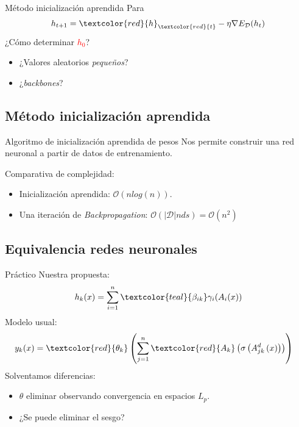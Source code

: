 \documentclass{beamer}
\begin{document}
\begin{frame}{Método inicialización aprendida}
    Para 
    \begin{align*}
        h_{t+1}  = \textcolor{red}{h}_{\textcolor{red}{t}} - \eta \nabla E_{\mathcal{D}}(h_t)
    \end{align*}
    ¿Cómo determinar  \textcolor{red}{$h_0$}?
    \pause
    \begin{itemize}
        \item ¿Valores aleatorios \textit{pequeños}?
        \item ¿\textit{backbones}?
    \end{itemize}
\end{frame}

\subsection{Método inicialización aprendida}
\begin{frame}{Algoritmo de inicialización aprendida de pesos}
    Nos permite construir una red neuronal a partir de datos de entrenamiento.

    Comparativa de complejidad:
    \begin{itemize}
        \item Inicialización aprendida: $\mathcal{O}(n log(n))$. 
        \item Una iteración de \textit{Backpropagation}: $\mathcal{O}(|\mathcal{D}| n d s) = \mathcal{O}(n^2)$
    \end{itemize}

\end{frame}

\subsection{Equivalencia redes neuronales}
\begin{frame}{Práctico}
    Nuestra propuesta: 
    \begin{align*}
                h_k(x) = 
                \sum_{i=1}^{n} \textcolor{teal}{\beta_{i k}} \gamma_{i}( A_{i}(x))
    \end{align*}
    Modelo usual:
    \begin{align*}
        y_k(x) &= 
        \textcolor{red}{\theta_k}
        \left( 
            \sum^n_{j=1} \textcolor{red}{A_{k}}
            \left(
                \sigma 
                \left(
                    A^{d}_{j k}
                    \left(
                        x
                    \right)
                \right)
            \right)
        \right)
    \end{align*}
    Solventamos diferencias: 
    \begin{itemize}
        \item $\theta$ eliminar observando convergencia en espacios $L_p$.
        \item ¿Se puede eliminar el sesgo?
    \end{itemize}
\end{frame}
\end{document}

